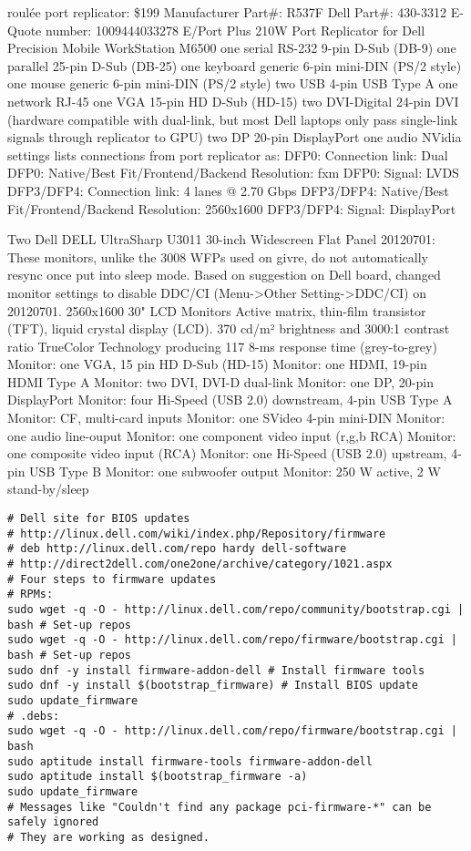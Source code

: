 \documentclass[12pt,twoside]{article}
\begin{document}
roulée port replicator: \$199
Manufacturer Part\#: R537F
Dell Part\#: 430-3312
E-Quote number: 1009444033278
E/Port Plus 210W Port Replicator for Dell Precision Mobile WorkStation M6500
one serial RS-232 9-pin D-Sub (DB-9) 
one parallel 25-pin D-Sub (DB-25) 
one keyboard generic 6-pin mini-DIN (PS/2 style) 
one mouse generic 6-pin mini-DIN (PS/2 style) 
two USB 4-pin USB Type A 
one network RJ-45 
one VGA 15-pin HD D-Sub (HD-15) 
two DVI-Digital 24-pin DVI (hardware compatible with dual-link, but most Dell laptops only pass single-link signals through replicator to GPU)
two DP 20-pin DisplayPort
one audio
NVidia settings lists connections from port replicator as:
DFP0: Connection link: Dual
DFP0: Native/Best Fit/Frontend/Backend Resolution: fxm
DFP0: Signal: LVDS
DFP3/DFP4: Connection link: 4 lanes @ 2.70 Gbps
DFP3/DFP4: Native/Best Fit/Frontend/Backend Resolution: 2560x1600
DFP3/DFP4: Signal: DisplayPort

Two Dell DELL UltraSharp U3011 30-inch Widescreen Flat Panel 
20120701: These monitors, unlike the 3008 WFPs used on givre,
do not automatically resync once put into sleep mode.
Based on suggestion on Dell board, changed monitor settings
to disable DDC/CI (Menu->Other Setting->DDC/CI) on 20120701.
2560x1600 30" LCD Monitors
Active matrix, thin-film transistor (TFT), liquid crystal display (LCD).
370 cd/m² brightness and 3000:1 contrast ratio
TrueColor Technology producing 117%
8-ms response time (grey-to-grey)
Monitor: one VGA, 15 pin HD D-Sub (HD-15)
Monitor: one HDMI, 19-pin HDMI Type A
Monitor: two DVI, DVI-D dual-link
Monitor: one DP, 20-pin DisplayPort
Monitor: four Hi-Speed (USB 2.0) downstream, 4-pin USB Type A
Monitor: CF, multi-card inputs
Monitor: one SVideo 4-pin mini-DIN
Monitor: one audio line-ouput
Monitor: one component video input (r,g,b RCA)
Monitor: one composite video input (RCA)
Monitor: one Hi-Speed (USB 2.0) upstream, 4-pin USB Type B
Monitor: one subwoofer output
Monitor: 250 W active, 2 W stand-by/sleep

\begin{verbatim}
# Dell site for BIOS updates
# http://linux.dell.com/wiki/index.php/Repository/firmware
# deb http://linux.dell.com/repo hardy dell-software
# http://direct2dell.com/one2one/archive/category/1021.aspx
# Four steps to firmware updates
# RPMs:
sudo wget -q -O - http://linux.dell.com/repo/community/bootstrap.cgi | bash # Set-up repos
sudo wget -q -O - http://linux.dell.com/repo/firmware/bootstrap.cgi | bash # Set-up repos
sudo dnf -y install firmware-addon-dell # Install firmware tools
sudo dnf -y install $(bootstrap_firmware) # Install BIOS update
sudo update_firmware
# .debs:
sudo wget -q -O - http://linux.dell.com/repo/firmware/bootstrap.cgi | bash
sudo aptitude install firmware-tools firmware-addon-dell
sudo aptitude install $(bootstrap_firmware -a)
sudo update_firmware
# Messages like "Couldn't find any package pci-firmware-*" can be safely ignored
# They are working as designed.
\end{verbatim}
\end{document}
